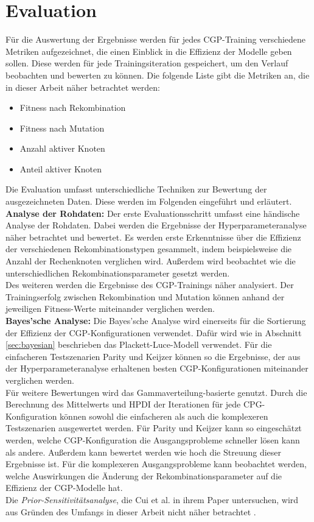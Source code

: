 \section{Evaluation}
\label{sec:Evaluation}

Für die Auswertung der Ergebnisse werden für jedes CGP-Training verschiedene Metriken aufgezeichnet, die einen Einblick in die Effizienz der Modelle geben sollen.
Diese werden für jede Trainingsiteration gespeichert, um den Verlauf beobachten und bewerten zu können.
Die folgende Liste gibt die Metriken an, die in dieser Arbeit näher betrachtet werden:
\begin{itemize}
	\item Fitness nach Rekombination
	\item Fitness nach Mutation
	\item Anzahl aktiver Knoten
	\item Anteil aktiver Knoten
\end{itemize}

Die Evaluation umfasst unterschiedliche Techniken zur Bewertung der ausgezeichneten Daten.
Diese werden im Folgenden eingeführt und erläutert.\\

\textbf{Analyse der Rohdaten:} Der erste Evaluationsschritt umfasst eine händische Analyse der Rohdaten.
Dabei werden die Ergebnisse der Hyperparameteranalyse näher betrachtet und bewertet.
Es werden erste Erkenntnisse über die Effizienz der verschiedenen Rekombinationstypen gesammelt, indem beispielsweise die Anzahl der Rechenknoten verglichen wird.
Außerdem wird beobachtet wie die unterschiedlichen Rekombinationsparameter gesetzt werden.\\
Des weiteren werden die Ergebnisse des CGP-Trainings näher analysiert.
Der Trainingserfolg zwischen Rekombination und Mutation können anhand der jeweiligen Fitness-Werte miteinander verglichen werden.\\

\textbf{Bayes'sche Analyse:} Die Bayes'sche Analyse wird einerseits für die Sortierung der Effizienz der CGP-Konfigurationen verwendet. 
Dafür wird wie in Abschnitt \ref{sec:bayesian} beschrieben das Plackett-Luce-Modell verwendet.
Für die einfacheren Testszenarien Parity und Keijzer können so die Ergebnisse, der aus der Hyperparameteranalyse erhaltenen besten CGP-Konfigurationen miteinander verglichen werden.\\
Für weitere Bewertungen wird das Gammaverteilung-basierte genutzt.
Durch die Berechnung des Mittelwerts und HPDI der Iterationen für jede CPG-Konfiguration können sowohl die einfacheren als auch die komplexeren Testszenarien ausgewertet werden.
Für Parity und Keijzer kann so eingeschätzt werden, welche CGP-Konfiguration die Ausgangsprobleme schneller lösen kann als andere.
Außerdem kann bewertet werden wie hoch die Streuung dieser Ergebnisse ist.
Für die komplexeren Ausgangsprobleme kann beobachtet werden, welche Auswirkungen die Änderung der Rekombinationsparameter auf die Effizienz der CGP-Modelle hat.\\
Die \emph{Prior-Sensitivitätsanalyse}, die Cui et al. in ihrem Paper untersuchen, wird aus Gründen des Umfangs in dieser Arbeit nicht näher betrachtet \cite{cui_equidistant_2023}.\\

